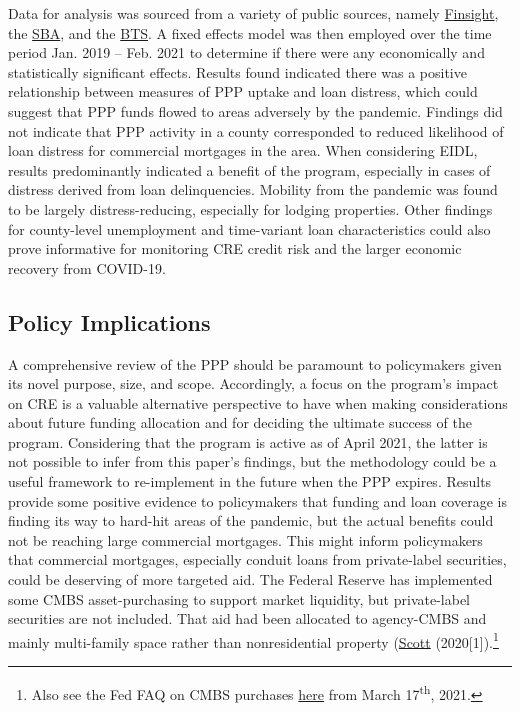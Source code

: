 \documentclass[11pt]{article} %
\begin{document}
Data for analysis was sourced from a variety of public sources, namely \href{https://finsight.com/}{Finsight}, the \href{https://www.sba.gov/}{SBA}, and the \href{https://www.bts.gov/}{BTS}. A fixed effects model was then employed over the time period Jan. 2019 -- Feb. 2021 to determine if there were any economically and statistically significant effects. Results found indicated there was a positive relationship between measures of PPP uptake and loan distress, which could suggest that PPP funds flowed to areas adversely by the pandemic. Findings did not indicate that PPP activity in a county corresponded to reduced likelihood of loan distress for commercial mortgages in the area. When considering EIDL, results predominantly indicated a benefit of the program, especially in cases of distress derived from loan delinquencies. Mobility from the pandemic was found to be largely distress-reducing, especially for lodging properties. Other findings for county-level unemployment and time-variant loan characteristics could also prove informative for monitoring CRE credit risk and the larger economic recovery from COVID-19. 

\subsection{Policy Implications}

A comprehensive review of the PPP should be paramount to policymakers given its novel purpose, size, and scope. Accordingly, a focus on the program's impact on CRE is a valuable alternative perspective to have when making considerations about future funding allocation and for deciding the ultimate success of the program. Considering that the program is active as of April 2021, the latter is not possible to infer from this paper's findings, but the methodology could be a useful framework to re-implement in the future when the PPP expires. Results provide some positive evidence to policymakers that funding and loan coverage is finding its way to hard-hit areas of the pandemic, but the actual benefits could not be reaching large commercial mortgages. This might inform policymakers that commercial mortgages, especially conduit loans from private-label securities, could be deserving of more targeted aid. The Federal Reserve has implemented some CMBS asset-purchasing to support market liquidity, but private-label securities are not included. That aid had been allocated to agency-CMBS and mainly multi-family space rather than nonresidential property (\hyperlink{Scott}{Scott} (2020[1]).\footnote{Also see the Fed FAQ on CMBS purchases \href{https://www.newyorkfed.org/markets/domestic-market-operations/monetary-policy-implementation/agency-commercial-mortgage-backed-securities/agency-commercial-mortgage-backed-securities-faq}{here} from March 17\textsuperscript{th}, 2021.} 
\end{document}
